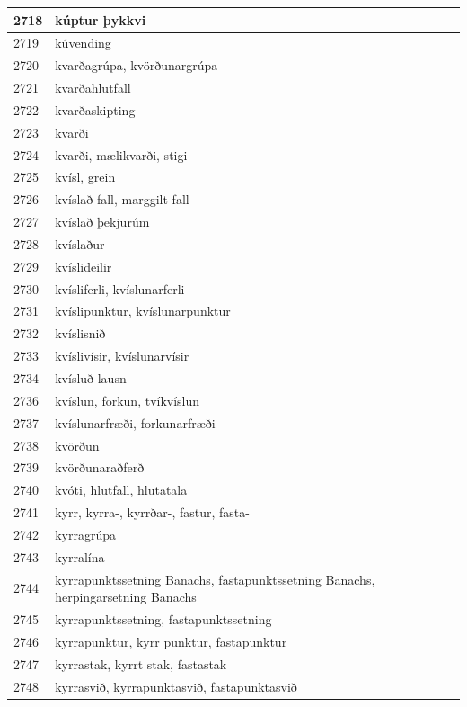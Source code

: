 \begin{longtable}{p{}|p{}|p{}|p{}|p{}}
\hline
2718 & kúptur þykkvi &  &  &  \\
\hline
2719 & kúvending &  &  &  \\
\hline
2720 & kvarðagrúpa, kvörðunargrúpa &  &  &  \\
\hline
2721 & kvarðahlutfall &  &  &  \\
\hline
2722 & kvarðaskipting &  &  &  \\
\hline
2723 & kvarði &  &  &  \\
\hline
2724 & kvarði, mælikvarði, stigi &  &  &  \\
\hline
2725 & kvísl, grein &  &  &  \\
\hline
2726 & kvíslað fall, marggilt fall &  &  &  \\
\hline
2727 & kvíslað þekjurúm &  &  &  \\
\hline
2728 & kvíslaður &  &  &  \\
\hline
2729 & kvíslideilir &  &  &  \\
\hline
2730 & kvísliferli, kvíslunarferli &  &  &  \\
\hline
2731 & kvíslipunktur, kvíslunarpunktur &  &  &  \\
\hline
2732 & kvíslisnið &  &  &  \\
\hline
2733 & kvíslivísir, kvíslunarvísir &  &  &  \\
\hline
2734 & kvísluð lausn &  &  &  \\
\hline
2736 & kvíslun, forkun, tvíkvíslun &  &  &  \\
\hline
2737 & kvíslunarfræði, forkunarfræði &  &  &  \\
\hline
2738 & kvörðun &  &  &  \\
\hline
2739 & kvörðunaraðferð &  &  &  \\
\hline
2740 & kvóti, hlutfall, hlutatala &  &  &  \\
\hline
2741 & kyrr, kyrra-, kyrrðar-, fastur, fasta- &  &  &  \\
\hline
2742 & kyrragrúpa &  &  &  \\
\hline
2743 & kyrralína &  &  &  \\
\hline
2744 & kyrrapunktssetning Banachs, fastapunktssetning Banachs, herpingarsetning Banachs &  &  &  \\
\hline
2745 & kyrrapunktssetning, fastapunktssetning &  &  &  \\
\hline
2746 & kyrrapunktur, kyrr punktur, fastapunktur &  &  &  \\
\hline
2747 & kyrrastak, kyrrt stak, fastastak &  &  &  \\
\hline
2748 & kyrrasvið, kyrrapunktasvið, fastapunktasvið &  &  &  \\

\end{longtable}
